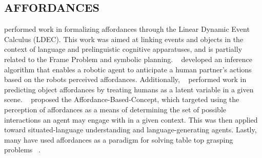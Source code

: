 \documentclass[]{article}
\newcommand{\dnote}[1]{\textcolor{Orange}{\textbf{D: #1}}}
\begin{document}
\subsection{AFFORDANCES}
\citep{steedman02} performed work in formalizing affordances through the 
Linear Dynamic Event Calculus (LDEC). This work was aimed at linking events and 
objects in the context of language and prelinguistic cognitive apparatuses, and is 
partially related to the Frame Problem and symbolic planning. ~\citep{koppula13a} 
developed an inference algorithm that enables a robotic agent to anticipate a human partner's 
actions based on the robots perceived affordances. Additionally, ~\citep{koppula13c} 
performed work in predicting object affordances by treating humans as a latent variable in a given scene. 
~\citep{gorniak05} proposed the Affordance-Based-Concept, which targeted using the perception 
of affordances as a means of determining the set of possible interactions an agent may engage with in a given context.
This was then applied toward situated-language understanding and language-generating agents. Lastly, 
many have used affordances as a paradigm for solving table top grasping problems ~\citep{pas13,sweeney07,detry09,montesano09}.
\end{document}

